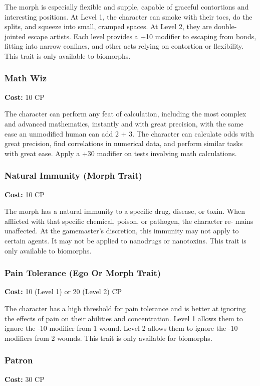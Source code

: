 The morph is especially flexible and supple, capable of graceful contortions
and interesting positions. At Level 1, the character can smoke with their toes,
do the splits, and squeeze into small, cramped spaces. At Level 2, they are
double-jointed escape artists. Each level provides a +10 modifier to escaping
from bonds, fitting into narrow confines, and other acts relying on contortion
or flexibility. This trait is only available to biomorphs.

\subsubsection{Math Wiz}
\textbf{Cost:} 10 CP

The character can perform any feat of calculation, including the most complex
and advanced mathematics, instantly and with great precision, with the same
ease an unmodified human can add 2 + 3. The character can calculate odds with
great precision, find correlations in numerical data, and perform similar tasks
with great ease. Apply a +30 modifier on tests involving math calculations.

\subsubsection{Natural Immunity (Morph Trait)}
\textbf{Cost:} 10 CP

The morph has a natural immunity to a specific drug, disease, or toxin. When
afflicted with that specific chemical, poison, or pathogen, the character re-
mains unaffected. At the gamemaster’s discretion, this immunity may not apply
to certain agents. It may not be applied to nanodrugs or nanotoxins. This trait
is only available to biomorphs.

\subsubsection{Pain Tolerance (Ego Or Morph Trait)}
\textbf{Cost:} 10 (Level 1) or 20 (Level 2) CP

The character has a high threshold for pain tolerance and is better at
ignoring the effects of pain on their abilities and concentration. Level 1
allows them to ignore the -10 modifier from 1 wound. Level 2 allows them to
ignore the -10 modifiers from 2 wounds. This trait is only available for
biomorphs.

\subsubsection{Patron}
\textbf{Cost:} 30 CP

